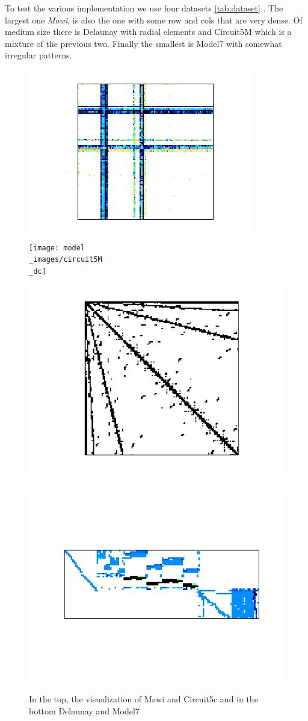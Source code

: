 \documentclass[conference]{IEEEtran}
\begin{document}
To test the various implementation we use four datasets \ref{tab:dataset} . The largest one \textit{Mawi}, is also the one with some row and cols that are very dense. Of medium size there is Delaunay with radial elements and Circuit5M which is a mixture of the previous two. Finally the smallest is Model7 with somewhat irregular patterns.
\FloatBarrier
\begin{figure}
	\centering
	\includegraphics[width=0.3\linewidth]{model_images/mawi_201512020330}
	\label{dat:mawi}
	~
	\texttt{[image: model\\\_images/circuit5M\\\_dc]}
	\label{dat:circuit}

	\includegraphics[width=0.3\linewidth]{model_images/delaunay_n23}
	\label{dat:delaunay}
	~
	\includegraphics[width=0.3\linewidth]{model_images/model7}
	\label{dat:model7}

	\caption{In the top, the visualization of Mawi and Circuit5c and in the bottom Delaunay and Model7}
	\label{img:data-vis}
\end{figure}
\end{document}
